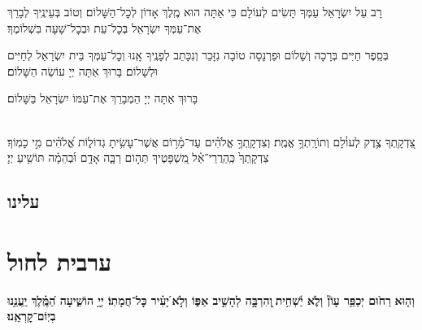 \documentclass[twoside, openany, parskip=half, 11pt]{book}
\begin{document}
\yaalehveyavo

\zion

\modim

\shabboschanukah

\shabboshodos

רָב עַל יִשְׂרָאֵל עַמְּךָ תָּשִׂים לְעוֹלָם כִּי אַתָּה הוּא מֶֽלֶךְ אָדוֹן לְכׇל־הַשָּׁלוֹם׃ וְטוֹב בְּעֵינֶֽיךָ לְבָרֵךְ אֶת־עַמְּךָ יִשְׂרָאֵל בְּכׇל־עֵת וּבְכׇל־שָׁעָה בִּשְׁלוֹמֶךָ׃
\vspace{-0.4\baselineskip}
\begin{paracol}{2}

\begin{small}
בְּסֵֽפֶר חַיִּים בְּרָכָה וְשָׁלוֹם וּפַרְנָסָה טוֹבָה נִזָּכֵר וְנִכָּתֵב לְפָנֶֽיךָ אָֽנוּ וְכׇל־עַמְּךָ בֵּית יִשְׂרָאֵל לְחַיִּים וּלְשָׁלוֹם׃ בָּרוּךְ אַתָּה יְיָ עוֹשֵׂה הַשָּׁלוֹם׃

\end{small}
\switchcolumn
בָּרוּךְ אַתָּה יְיָ הַמְבָרֵךְ אֶת־עַמּוֹ יִשְׂרָאֵל בַּשָּׁלוֹם׃

\end{paracol}

\tachanunim

\\
צִ֭דְקָֽתְךָ צֶ֥דֶק לְעוֹ֗לָם וְתוֹרָֽתְךָ֥ אֱמֶֽת׃ וְצִדְקָֽתְךָ֥ אֱלֹהִ֗ים עַד־מָ֫ר֥וֹם אֲשֶׁר־עָשִׂ֥יתָ גְדוֹל֑וֹת אֱ֝לֹהִ֗ים מִ֣י כָמֽוֹךָ׃ צִדְקָֽתְךָ֙ כְּֽהַרֲרֵי־אֵ֗ל מִ֭שְׁפָּטֶיךָ תְּה֣וֹם רַבָּ֑ה אָדָ֥ם וּ֜בְהֵמָ֗ה תּוֹשִׁ֥יעַ יְיָ׃

\fullkaddish

\section*{ עלינו }

\aleinu





%
\chapter[ערבית לחול]{ ערבית לחול }

\textbf{וְה֤וּא}\textbf{
רַח֙וּם יְכַפֵּ֥ר עָוֹן֘ וְלֹ֢א יַ֫שְׁחִ֥ית ֖וְהִרְבָּ֣ה לְהָשִׁ֣יב אַפּ֑וֹ וְלֹ֣א ֝יָעִ֗יר כׇּל־חֲמָתֽוֹ׃ יְיָ֥ הוֹשִׁ֑יעָה הַ֝מֶּֽ֗לֶךְ יַֽעֲנֵ֥נוּ בְיֽוֹם־קׇרְאֵֽנוּ׃}
\end{document}
